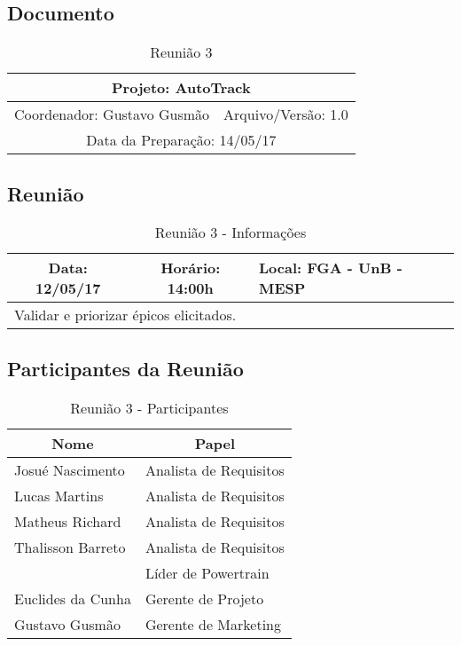 \begin{apendicesenv}
\subsection{Documento}
\begin{table}[!h]
  \centering
  \caption{Reunião 3}
  \begin{tabular}{|c|c|}
  \hline
  \multicolumn{2}{|c|}{Projeto: AutoTrack}                   \\ \hline
  Coordenador: Gustavo Gusmão & Arquivo/Versão: 1.0 \\ \hline
  \multicolumn{2}{|c|}{Data da Preparação: 14/05/17}         \\ \hline
  \end{tabular}
\end{table}

\subsection{Reunião}
\begin{table}[h]
  \centering
  \caption{Reunião 3 - Informações}
  \begin{tabular}{|l|c|l|}
  \hline
  \multicolumn{1}{|c|}{Data: 12/05/17}      & Horário: 14:00h     & Local: FGA - UnB - MESP     \\ \hline
  \multicolumn{3}{|l|}{Validar e priorizar épicos elicitados.} \\ \hline
  \end{tabular}
\end{table}


\subsection{Participantes da Reunião}
\begin{table}[!h]
\centering
\caption{Reunião 3 - Participantes}
\begin{tabular}{|l|l|}
\hline
\multicolumn{1}{|c|}{\textbf{Nome}} & \multicolumn{1}{c|}{\textbf{Papel}} \\ \hline
  Josué Nascimento                    & Analista de Requisitos              \\ \hline
  Lucas Martins                       & Analista de Requisitos              \\ \hline
  Matheus Richard                     & Analista de Requisitos              \\ \hline
  Thalisson Barreto                   & Analista de Requisitos              \\ \hline
                                      & Líder de Powertrain                 \\ \hline
  Euclides da Cunha                   & Gerente de Projeto                  \\ \hline
  Gustavo Gusmão                      & Gerente de Marketing                \\ \hline
  \end{tabular}
\end{table}


\end{apendicesenv}
